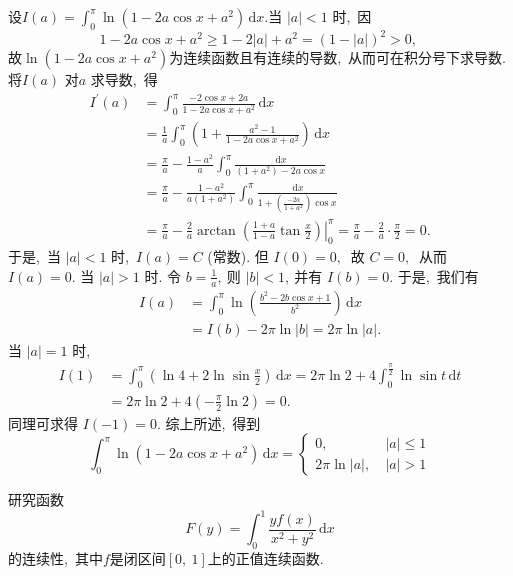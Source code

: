 	\begin{solution}
		设$  I(a)=\int_{0}^{\pi} \ln \left(1-2 a \cos x+a^{2}\right) \,\text{d}x . $当  $|a|<1$  时,\  因
		$$1-2 a \cos x+a^{2} \geqslant 1-2|a|+a^{2}=(1-|a|)^{2}>0 \text {,\  }$$
		故$  \ln \left(1-2 a \cos x+a^{2}\right)  $为连续函数且有连续的导数,\  从而可在积分号下求导数. 将$  I(a) $ 对$  a $ 求导数,\  得
		$$\begin{aligned}
			I^{\prime}(a) &=\int_{0}^{\pi} \frac{-2 \cos x+2 a}{1-2 a \cos x+a^{2}} \,\text{d} x \\
			&=\frac{1}{a} \int_{0}^{\pi}\left(1+\frac{a^{2}-1}{1-2 a \cos x+a^{2}}\right) \,\text{d} x \\
			&=\frac{\pi}{a}-\frac{1-a^{2}}{a} \int_{0}^{\pi} \frac{\,\text{d} x}{\left(1+a^{2}\right)-2 a \cos x} \\
			&=\frac{\pi}{a}-\frac{1-a^{2}}{a\left(1+a^{2}\right)} \int_{0}^{\pi} \frac{\,\text{d} x}{1+\left(\frac{-2 a}{1+a^{2}}\right) \cos x} \\
			&=\frac{\pi}{a}-\left.\frac{2}{a} \arctan \left(\frac{1+a}{1-a} \tan \frac{x}{2}\right)\right|_{0} ^{\pi}=\frac{\pi}{a}-\frac{2}{a} \cdot \frac{\pi}{2}=0 .
		\end{aligned}$$
		于是,\  当 $ |a|<1$  时,\   $I(a)=C $ (常数). 但 $ I(0)=0 ,\ $ 故 $ C=0 ,\ $ 从而  $I(a)=0 .$
		当 $ |a|>1 $ 时. 令 $ b=\frac{1}{a} ,\  $则 $ |b|<1 ,\  $并有 $ I(b)=0 .$ 于是,\  我们有
		$$\begin{aligned}
			I(a) &=\int_{0}^{\pi} \ln \left(\frac{b^{2}-2 b \cos x+1}{b^{2}}\right) \,\text{d}x \\
			&=I(b)-2 \pi \ln |b|=2 \pi \ln |a| .
		\end{aligned}$$
		当  $|a|=1 $ 时,\ 
		$$\begin{aligned}
			I(1) &=\int_{0}^{\pi}\left(\ln 4+2 \ln \sin \frac{x}{2}\right) \,\text{d} x=2 \pi \ln 2+4 \int_{0}^{\frac{\pi}{2}} \ln \sin t \,\text{d} t \\
			&=2 \pi \ln 2+4\left(-\frac{\pi}{2} \ln 2\right)=0 .
		\end{aligned}$$
		同理可求得 $ I(-1)=0 .$
		综上所述,\  得到
		$$\int_{0}^{\pi} \ln \left(1-2 a \cos x+a^{2}\right) \,\text{d} x=\left\{\begin{array}{ll}
			0,\  & |a| \leqslant 1 \\
			2 \pi \ln |a|,\  & |a|>1
		\end{array}\right.$$ 
	\end{solution}
	\newpage
	\begin{problem}
		研究函数$$ F(y)=\int_{0}^{1} \frac{y f(x)}{x^{2}+y^{2}} \,\text{d} x $$ 的连续性,\  其中$  f  $是闭区间$  [0,\ 1]  $上的正值连续函数.
	\end{problem}
	
